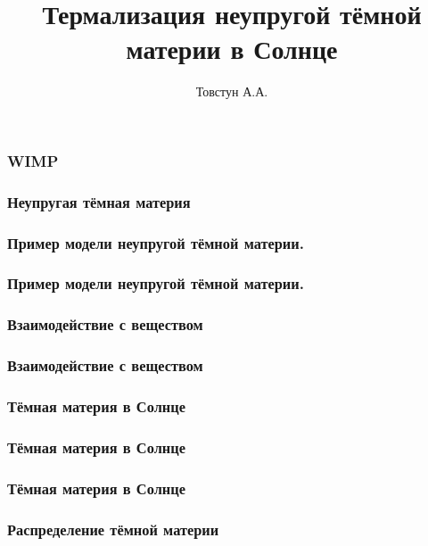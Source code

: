 


\title{Термализация неупругой тёмной материи в Солнце} 
\author[]{Товстун А.А.}
	
	\begin{frame}
		\titlepage %
	\end{frame}
	
%		
	
	\begin{frame}
		\frametitle{WIMP}
		
	\end{frame}
	
	\begin{frame}
		\frametitle{Неупругая тёмная материя}
		
	\end{frame}
	
	\begin{frame}
		\frametitle{Пример модели неупругой тёмной материи.}
		
	\end{frame}
	
	\begin{frame}
		\frametitle{Пример модели неупругой тёмной материи.}
		
	\end{frame}
	
	\begin{frame}
		\frametitle{Взаимодействие с веществом}
		
	\end{frame}
	
	\begin{frame}
		\frametitle{Взаимодействие с веществом}
		
	\end{frame}
	
	\begin{frame}
		\frametitle{Тёмная материя в Солнце}
		
	\end{frame}
	
	\begin{frame}
		\frametitle{Тёмная материя в Солнце}
		
	\end{frame}

	\begin{frame}
	\frametitle{Тёмная материя в Солнце}
	
	\end{frame}
	
	\begin{frame}
		\frametitle{Распределение тёмной материи}
		
	\end{frame}
	
